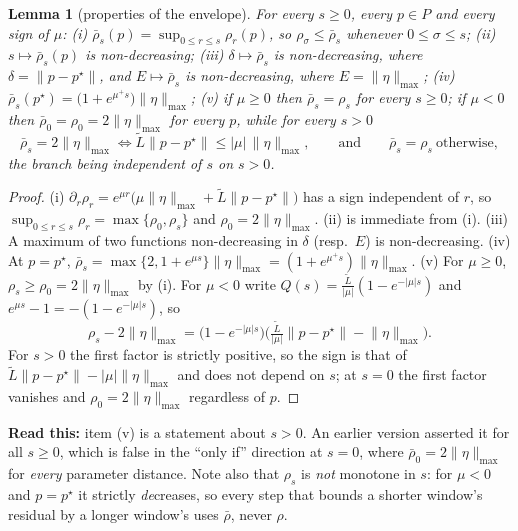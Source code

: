 \documentclass[11pt]{article}
\newtheorem{lemma}{Lemma}
\theoremstyle{remark}\newtheorem{remark}{Remark}
\newcommand{\pstar}{p^\star}
\newcommand{\norm}[1]{\lVert #1\rVert}
\newcommand{\readthis}[1]{\textbf{Read this:} #1}
\begin{document}
\begin{lemma}[properties of the envelope]\label{lem:rhobar}
For every $s\ge0$, every $p\in P$ and every sign of $\mu$:
\emph{(i)} $\bar\rho_s(p)=\sup_{0\le r\le s}\rho_r(p)$, so $\rho_\sigma\le\bar\rho_s$ whenever $0\le\sigma\le s$;
\emph{(ii)} $s\mapsto\bar\rho_s(p)$ is non-decreasing;
\emph{(iii)} $\delta\mapsto\bar\rho_s$ is non-decreasing, where $\delta=\norm{p-\pstar}$, and $E\mapsto\bar\rho_s$ is non-decreasing, where $E=\norm\eta_{\max}$;
\emph{(iv)} $\bar\rho_s(\pstar)=\big(1+e^{\mu^{+}s}\big)\norm\eta_{\max}$;
\emph{(v)} if $\mu\ge0$ then $\bar\rho_s=\rho_s$ for every $s\ge0$; if $\mu<0$ then $\bar\rho_0=\rho_0=2\norm\eta_{\max}$ for every $p$, while for every $s>0$
\[
\bar\rho_s=2\norm\eta_{\max}\iff\tilde L\norm{p-\pstar}\le|\mu|\,\norm\eta_{\max},
\qquad\text{and}\qquad \bar\rho_s=\rho_s\ \text{otherwise},
\]
the branch being independent of $s$ on $s>0$.
\end{lemma}
\begin{proof}
(i) $\partial_r\rho_r=e^{\mu r}\big(\mu\norm\eta_{\max}+\tilde L\norm{p-\pstar}\big)$ has a sign independent of $r$, so $\sup_{0\le r\le s}\rho_r=\max\{\rho_0,\rho_s\}$ and $\rho_0=2\norm\eta_{\max}$. (ii) is immediate from (i). (iii) A maximum of two functions non-decreasing in $\delta$ (resp.\ $E$) is non-decreasing. (iv) At $p=\pstar$, $\bar\rho_s=\max\{2,1+e^{\mu s}\}\norm\eta_{\max}=(1+e^{\mu^{+}s})\norm\eta_{\max}$. (v) For $\mu\ge0$, $\rho_s\ge\rho_0=2\norm\eta_{\max}$ by (i). For $\mu<0$ write $Q(s)=\frac{\tilde L}{|\mu|}(1-e^{-|\mu|s})$ and $e^{\mu s}-1=-(1-e^{-|\mu|s})$, so
\[
\rho_s-2\norm\eta_{\max}=\big(1-e^{-|\mu|s}\big)
\Big(\tfrac{\tilde L}{|\mu|}\norm{p-\pstar}-\norm\eta_{\max}\Big).
\]
For $s>0$ the first factor is strictly positive, so the sign is that of $\tilde L\norm{p-\pstar}-|\mu|\norm\eta_{\max}$ and does not depend on $s$; at $s=0$ the first factor vanishes and $\rho_0=2\norm\eta_{\max}$ regardless of $p$.
\end{proof}
\readthis{item (v) is a statement about $s>0$. An earlier version asserted it for all $s\ge0$, which is false in the ``only if'' direction at $s=0$, where $\bar\rho_0=2\norm\eta_{\max}$ for \emph{every} parameter distance. Note also that $\rho_s$ is \emph{not} monotone in $s$: for $\mu<0$ and $p=\pstar$ it strictly \emph{de}creases, so every step that bounds a shorter window's residual by a longer window's uses $\bar\rho$, never $\rho$.}
\end{document}
